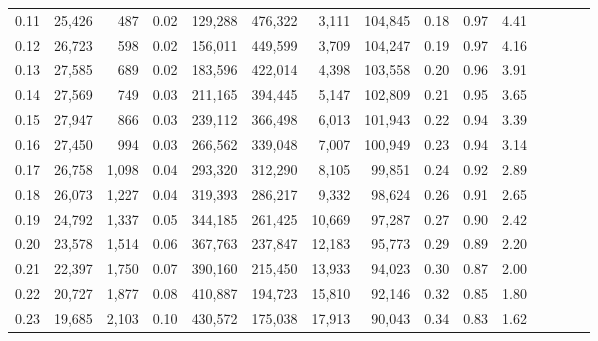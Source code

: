 \begin{tabular}{rrrcrrrrrrrrrrr}
0.11 &  25,426 &    487 &                                       0.02 &  129,288 &  476,322 &    3,111 &  104,845 &  0.18 &  0.97 &                         4.41 \\
0.12 &  26,723 &    598 &                                       0.02 &  156,011 &  449,599 &    3,709 &  104,247 &  0.19 &  0.97 &                         4.16 \\
0.13 &  27,585 &    689 &                                       0.02 &  183,596 &  422,014 &    4,398 &  103,558 &  0.20 &  0.96 &                         3.91 \\
0.14 &  27,569 &    749 &                                       0.03 &  211,165 &  394,445 &    5,147 &  102,809 &  0.21 &  0.95 &                         3.65 \\
0.15 &  27,947 &    866 &                                       0.03 &  239,112 &  366,498 &    6,013 &  101,943 &  0.22 &  0.94 &                         3.39 \\
0.16 &  27,450 &    994 &                                       0.03 &  266,562 &  339,048 &    7,007 &  100,949 &  0.23 &  0.94 &                         3.14 \\
0.17 &  26,758 &  1,098 &                                       0.04 &  293,320 &  312,290 &    8,105 &   99,851 &  0.24 &  0.92 &                         2.89 \\
0.18 &  26,073 &  1,227 &                                       0.04 &  319,393 &  286,217 &    9,332 &   98,624 &  0.26 &  0.91 &                         2.65 \\
0.19 &  24,792 &  1,337 &                                       0.05 &  344,185 &  261,425 &   10,669 &   97,287 &  0.27 &  0.90 &                         2.42 \\
0.20 &  23,578 &  1,514 &                                       0.06 &  367,763 &  237,847 &   12,183 &   95,773 &  0.29 &  0.89 &                         2.20 \\
0.21 &  22,397 &  1,750 &                                       0.07 &  390,160 &  215,450 &   13,933 &   94,023 &  0.30 &  0.87 &                         2.00 \\
0.22 &  20,727 &  1,877 &                                       0.08 &  410,887 &  194,723 &   15,810 &   92,146 &  0.32 &  0.85 &                         1.80 \\
0.23 &  19,685 &  2,103 &                                       0.10 &  430,572 &  175,038 &   17,913 &   90,043 &  0.34 &  0.83 &                         1.62 \\

\end{tabular}

